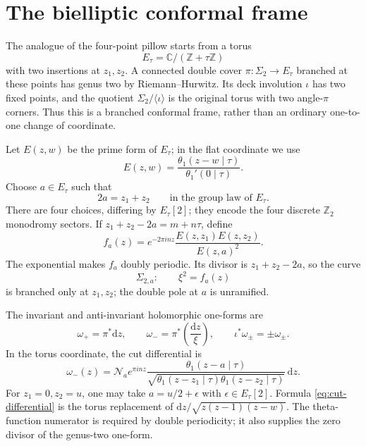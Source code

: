 \documentclass[11pt]{article}
\newcommand{\dd}{\mathrm d}
\begin{document}
\section{The bielliptic conformal frame}
\label{sec:bielliptic-frame}

The analogue of the four-point pillow starts from a torus
\begin{equation}
 E_\tau=\mathbb C/(\mathbb Z+\tau\mathbb Z)
\end{equation}
with two insertions at $z_1,z_2$.  A connected double cover
$\pi:\Sigma_2\to E_\tau$ branched at these points has genus two by
Riemann--Hurwitz.  Its deck involution $\iota$ has two fixed points, and the
quotient $\Sigma_2/\langle\iota\rangle$ is the original torus with two
angle-$\pi$ corners.  Thus this is a branched conformal frame, rather than an
ordinary one-to-one change of coordinate.

Let $E(z,w)$ be the prime form of $E_\tau$; in the flat coordinate we use
\begin{equation}
 E(z,w)=\frac{\theta_1(z-w\mid\tau)}{\theta_1'(0\mid\tau)}.
\end{equation}
Choose $a\in E_\tau$ such that
\begin{equation}
 2a=z_1+z_2
 \qquad\text{in the group law of }E_\tau.
 \label{eq:half-branch-divisor}
\end{equation}
There are four choices, differing by $E_\tau[2]$; they encode the four
discrete $\mathbb Z_2$ monodromy sectors.  If
$z_1+z_2-2a=m+n\tau$, define
\begin{equation}
 f_a(z)=e^{-2\pi i n z}
 \frac{E(z,z_1)E(z,z_2)}{E(z,a)^2}.
 \label{eq:elliptic-cover-function}
\end{equation}
The exponential makes $f_a$ doubly periodic.  Its divisor is
$z_1+z_2-2a$, so the curve
\begin{equation}
 \boxed{\Sigma_{2,a}:\qquad \xi^2=f_a(z)}
 \label{eq:bielliptic-cover}
\end{equation}
is branched only at $z_1,z_2$; the double pole at $a$ is unramified.

The invariant and anti-invariant holomorphic one-forms are
\begin{equation}
 \omega_+=\pi^*\dd z,
 \qquad
 \omega_-=\pi^*\!\left(\frac{\dd z}{\xi}\right),
 \qquad
 \iota^*\omega_\pm=\pm\omega_\pm .
 \label{eq:eigen-one-forms}
\end{equation}
In the torus coordinate, the cut differential is
\begin{equation}
 \boxed{
 \omega_-(z)=\mathcal N_a e^{\pi i n z}
 \frac{\theta_1(z-a\mid\tau)}
 {\sqrt{\theta_1(z-z_1\mid\tau)\theta_1(z-z_2\mid\tau)}}\,\dd z .}
 \label{eq:cut-differential}
\end{equation}
For $z_1=0,z_2=u$, one may take
$a=u/2+\epsilon$ with $\epsilon\in E_\tau[2]$.  Formula
\eqref{eq:cut-differential} is the torus replacement of
$\dd z/\sqrt{z(z-1)(z-w)}$.  The theta-function numerator is required by
double periodicity; it also supplies the zero divisor of the genus-two
one-form.
\end{document}
